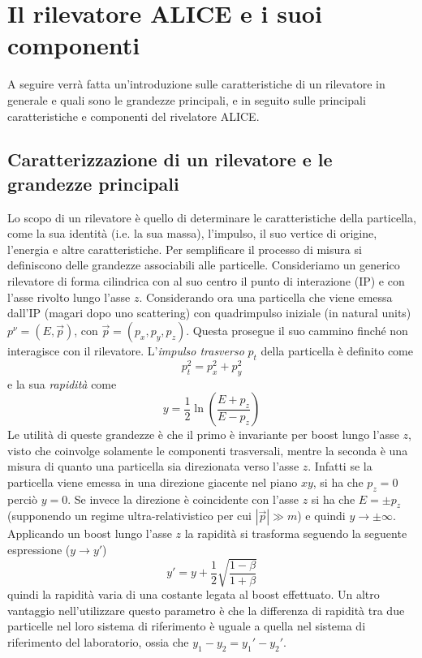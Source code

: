 \section{Il rilevatore ALICE e i suoi componenti}
A seguire verrà fatta un'introduzione sulle caratteristiche di un rilevatore in generale e quali sono le grandezze principali, e in seguito sulle principali caratteristiche e componenti del rivelatore ALICE.

\subsection{Caratterizzazione di un rilevatore e le grandezze principali}
Lo scopo di un rilevatore è quello di determinare le caratteristiche della particella, come la sua identità (i.e. la sua massa), l'impulso, il suo vertice di origine, l'energia e altre caratteristiche.
Per semplificare il processo di misura si definiscono delle grandezze associabili alle particelle.
Consideriamo un generico rilevatore di forma cilindrica con al suo centro il punto di interazione (IP) e con l'asse rivolto lungo l'asse $z$.
Considerando ora una particella che viene emessa dall'IP (magari dopo uno scattering) con quadrimpulso iniziale (in \textit{}{natural units}) $p^\nu = (E,\vec p)$, con $\vec p = (p_{x}, p_{y}, p_{z})$.
Questa prosegue il suo cammino finché non interagisce con il rilevatore.
L'\emph{impulso trasverso} $p_t$ della particella è definito come 
\begin{equation}
    p_t^2 = p_x^2 + p_y^2
\end{equation}
e la sua \emph{rapidità} come 
\begin{equation}
    y = \dfrac12 \ln\left(\dfrac{E+p_z}{E-p_z}\right)
\end{equation}
Le utilità di queste grandezze è che il primo è invariante per boost lungo l'asse $z$, visto che coinvolge solamente le componenti trasversali, mentre la seconda è una misura di quanto una particella sia direzionata verso l'asse $z$.
Infatti se la particella viene emessa in una direzione giacente nel piano $xy$, si ha che $p_z=0$ perciò $y=0$.
Se invece la direzione è coincidente con l'asse $z$ si ha che $E = \pm p_z$ (supponendo un regime ultra-relativistico per cui $|\vec p| \gg m$) e quindi $y\to \pm\infty$.
Applicando un boost lungo l'asse $z$ la rapidità si trasforma seguendo la seguente espressione ($y\to y'$)
\begin{equation}
    y' = y + \dfrac12\sqrt{\dfrac{1-\beta}{1+\beta}}
\end{equation}
quindi la rapidità varia di una costante legata al boost effettuato.
Un altro vantaggio nell'utilizzare questo parametro è che la differenza di rapidità tra due particelle nel loro sistema di riferimento è uguale a quella nel sistema di riferimento del laboratorio, ossia che $y_1-y_2 = y_1'-y_2'$.

